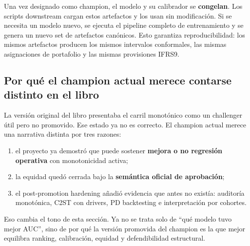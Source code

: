 \documentclass[
  spanish,
  11pt,
  letterpaper,
]{scrbook}
\providecommand{\tightlist}{%
  \setlength{\itemsep}{0pt}\setlength{\parskip}{0pt}}
\theoremstyle{plain}
\theoremstyle{remark}
\begin{document}
\begin{tcolorbox}[enhanced jigsaw, arc=.35mm, bottomrule=.15mm, bottomtitle=1mm, breakable, colback=white, colbacktitle=quarto-callout-important-color!10!white, colframe=quarto-callout-important-color-frame, coltitle=black, left=2mm, leftrule=.75mm, opacityback=0, opacitybacktitle=0.6, rightrule=.15mm, title=\textcolor{quarto-callout-important-color}{\faExclamation}\hspace{0.5em}{Principio de inmutabilidad}, titlerule=0mm, toprule=.15mm, toptitle=1mm]

Una vez designado como champion, el modelo y su calibrador se
\textbf{congelan}. Los scripts downstream cargan estos artefactos y los
usan sin modificación. Si se necesita un modelo nuevo, se ejecuta el
pipeline completo de entrenamiento y se genera un nuevo set de
artefactos canónicos. Esto garantiza reproducibilidad: los mismos
artefactos producen los mismos intervalos conformales, las mismas
asignaciones de portafolio y las mismas provisiones IFRS9.

\end{tcolorbox}

\subsection{Por qué el champion actual merece contarse distinto en el
libro}\label{por-quuxe9-el-champion-actual-merece-contarse-distinto-en-el-libro}

La versión original del libro presentaba el carril monotónico como un
challenger útil pero no promovido. Ese estado ya no es correcto. El
champion actual merece una narrativa distinta por tres razones:

\begin{enumerate}
\def\labelenumi{\arabic{enumi}.}
\tightlist
\item
  el proyecto ya demostró que puede sostener \textbf{mejora o no
  regresión operativa} con monotonicidad activa;
\item
  la equidad quedó cerrada bajo la \textbf{semántica oficial de
  aprobación};
\item
  el post-promotion hardening añadió evidencia que antes no existía:
  auditoría monotónica, C2ST con drivers, PD backtesting e
  interpretación por cohortes.
\end{enumerate}

Eso cambia el tono de esta sección. Ya no se trata solo de ``qué modelo
tuvo mejor AUC'', sino de por qué la versión promovida del champion es
la que mejor equilibra ranking, calibración, equidad y defendibilidad
estructural.
\end{document}
